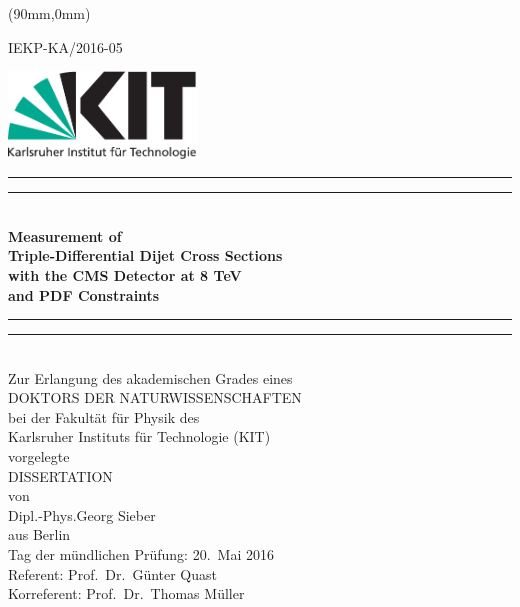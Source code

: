 \begin{titlepage}
    \begin{center}
        \begin{textblock*}{5cm}(90mm,0mm)
            \begin{flushright}
                \small
                IEKP-KA/2016-05
            \end{flushright}
        \end{textblock*}
        \includegraphics[width=5.0cm]{figures/Kitlogo_de_cmyk}
        \vspace*{2cm}

        \vspace*{\baselineskip}
        \rule{\textwidth}{1.6pt}\vspace*{-\baselineskip}\vspace*{2pt}
        \rule{\textwidth}{0.4pt}\\[\baselineskip]
        \LARGE{\textbf{Measurement of\\
            Triple-Differential Dijet Cross Sections\\
            with the CMS Detector at 8 TeV\\
        and PDF Constraints}}\\
        \rule{\textwidth}{0.4pt}\vspace*{-\baselineskip}\vspace{3.2pt}
        \rule{\textwidth}{1.6pt}\\[\baselineskip]
        \vspace{6ex}
        \large Zur Erlangung des akademischen Grades eines\\[2.5ex]
        \textsc{DOKTORS DER NATURWISSENSCHAFTEN}\\[2.5ex]
            bei der Fakult\"at f\"ur Physik des\\
        Karlsruher Instituts f\"ur Technologie (KIT)\\ 
        vorgelegte\\
        \vspace{2.5ex}
        \textsc{DISSERTATION}\\
        \vspace{2.5ex}
        von\\
        \vspace{2ex}
        Dipl.-Phys.\;Georg Sieber\\
        aus Berlin\\

\vspace{\fill}
Tag der mündlichen Prüfung: 20.\ Mai 2016\\[1.5ex]
Referent: Prof.\ Dr.\ Günter Quast\\[0.5ex]
Korreferent: Prof.\ Dr.\ Thomas Müller
    \end{center}
\end{titlepage}
\cleardoublepage
